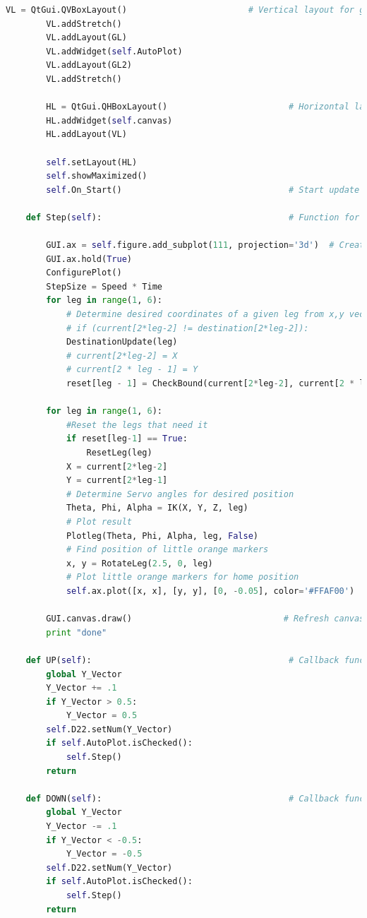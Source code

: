 \begin{lstlisting}[language = python]
        VL = QtGui.QVBoxLayout()                        # Vertical layout for grid layouts
        VL.addStretch()
        VL.addLayout(GL)
        VL.addWidget(self.AutoPlot)
        VL.addLayout(GL2)
        VL.addStretch()

        HL = QtGui.QHBoxLayout()                        # Horizontal layout for canvas and vertical layout
        HL.addWidget(self.canvas)
        HL.addLayout(VL)

        self.setLayout(HL)
        self.showMaximized()
        self.On_Start()                                 # Start update timer

    def Step(self):                                     # Function for updating the plot in the UI

        GUI.ax = self.figure.add_subplot(111, projection='3d')  # Create axis on plot
        GUI.ax.hold(True)
        ConfigurePlot()
        StepSize = Speed * Time
        for leg in range(1, 6):
            # Determine desired coordinates of a given leg from x,y vectors and rotation
            # if (current[2*leg-2] != destination[2*leg-2]):
            DestinationUpdate(leg)
            # current[2*leg-2] = X
            # current[2 * leg - 1] = Y
            reset[leg - 1] = CheckBound(current[2*leg-2], current[2 * leg - 1], leg)

        for leg in range(1, 6):
            #Reset the legs that need it
            if reset[leg-1] == True:
                ResetLeg(leg)
            X = current[2*leg-2]
            Y = current[2*leg-1]
            # Determine Servo angles for desired position
            Theta, Phi, Alpha = IK(X, Y, Z, leg)
            # Plot result
            Plotleg(Theta, Phi, Alpha, leg, False)
            # Find position of little orange markers
            x, y = RotateLeg(2.5, 0, leg)
            # Plot little orange markers for home position
            self.ax.plot([x, x], [y, y], [0, -0.05], color='#FFAF00')

        GUI.canvas.draw()                              # Refresh canvas
        print "done"

    def UP(self):                                       # Callback function for Button
        global Y_Vector
        Y_Vector += .1
        if Y_Vector > 0.5:
            Y_Vector = 0.5
        self.D22.setNum(Y_Vector)
        if self.AutoPlot.isChecked():
            self.Step()
        return

    def DOWN(self):                                     # Callback function for Button
        global Y_Vector
        Y_Vector -= .1
        if Y_Vector < -0.5:
            Y_Vector = -0.5
        self.D22.setNum(Y_Vector)
        if self.AutoPlot.isChecked():
            self.Step()
        return


\end{lstlisting}
